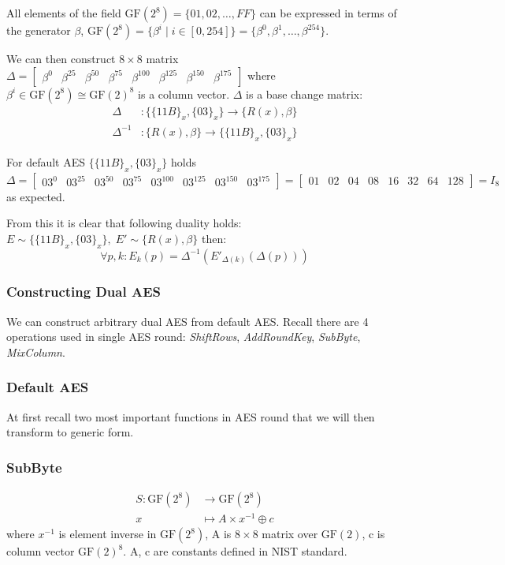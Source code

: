 \documentclass[11pt,oneside,final]{fithesis2}
\begin{document}
	All elements of the field $\text{GF}(2^8) = \{01, 02, \dots, FF\}$
	can be expressed in terms of the generator $\beta$, $\text{GF}(2^8) = \{\beta^i \; | \; i \in [0,254]\} = \{\beta^0, \beta^1, \dots, \beta^{254}\}$.

	We can then construct $8 \times 8$ matrix $\Delta = \begin{bmatrix} \beta^0 & \beta^{25} & \beta^{50} & \beta^{75} & \beta^{100} & \beta^{125} & \beta^{150} & \beta^{175}  \end{bmatrix}$ where 
	$\beta^i \in \text{GF}(2^8) \cong \text{GF}(2)^8$ is a column vector.  $\Delta$ is a base change matrix:
	\begin{align}
	    \Delta &: \{\{11B\}_x, \{03\}_x\}  \longrightarrow \{R(x), \beta \} \\
	    \Delta^{-1} &: \{R(x), \beta \}  \longrightarrow \{\{11B\}_x, \{03\}_x\}
	\end{align}

	For default AES $\{\{11B\}_x, \{03\}_x\}$ holds $\Delta = \begin{bmatrix} 03^0 & 03^{25} & 03^{50} & 03^{75} & 03^{100} & 03^{125} & 03^{150} & 03^{175}  \end{bmatrix} = \begin{bmatrix} 01 & 02 & 04 & 08 & 16 & 32 & 64 & 128 \end{bmatrix} = I_8$ as expected.

	From this it is clear that following duality holds: $E \sim \{\{11B\}_x, \{03\}_x\}, \; E' \sim \{R(x), \beta \}$ then:
	\begin{equation} 
	\forall p, k: E_k(p) = \Delta^{-1}\left(E'_{\Delta(k)}(\Delta(p))\right)
	\end{equation}

	\subsubsection*{Constructing Dual AES}
	We can construct arbitrary dual AES from default AES. Recall there are 4 operations used in single AES round: \emph{ShiftRows}, \emph{AddRoundKey}, \emph{SubByte}, \emph{MixColumn}.

	\subsubsection*{Default AES}
	At first recall two most important functions in AES round that we will then transform to generic form.

	\subsubsection*{SubByte}
	\begin{align}
	S: \text{GF}(2^8) & \longrightarrow  \text{GF}(2^8)\\
	x               & \longmapsto A \times x^{-1} \oplus c
	\end{align}
	where $x^{-1}$ is element inverse in $\text{GF}(2^8)$, A is $8 \times 8$ matrix over $\text{GF}(2)$, c is column vector $\text{GF}(2)^8$. A, c are constants defined in NIST standard.
\end{document}
